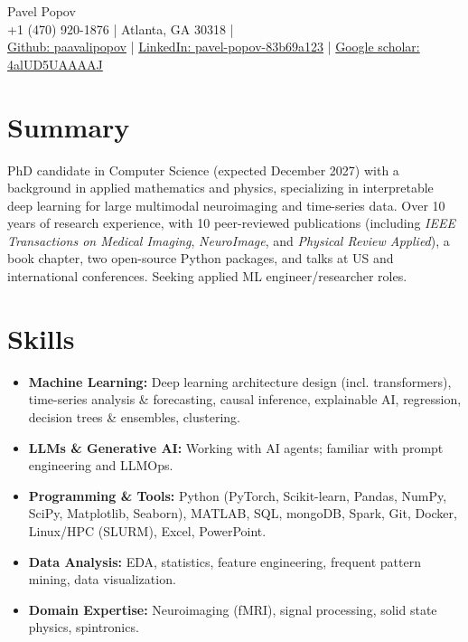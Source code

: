 \documentclass[11pt,a4paper]{article}
\begin{document}
\begin{center}
  {\Huge Pavel Popov}\\[0.5em]
  {\footnotesize +1 (470) 920-1876 \quad | \quad Atlanta, GA 30318} \quad | \\
  {\small \href{https://github.com/paavalipopov}{Github: paavalipopov} \quad | \quad
  \href{https://www.linkedin.com/in/pavel-popov-83b69a123/}{LinkedIn: pavel-popov-83b69a123} \quad | \quad
  \href{https://scholar.google.com/citations?user=4alUD5UAAAAJ}{Google scholar: 4alUD5UAAAAJ}}
\end{center}

\section*{Summary}
{\small \noindent PhD candidate in Computer Science (expected December 2027) with a background in applied mathematics and physics, specializing in interpretable deep learning for large multimodal neuroimaging and time-series data.
Over 10 years of research experience, with 10 peer-reviewed publications (including \textit{IEEE Transactions on Medical Imaging}, \textit{NeuroImage}, and \textit{Physical Review Applied}), a book chapter, two open-source Python packages, and talks at US and international conferences. Seeking applied ML engineer/researcher roles.}

\section*{Skills}
\begin{itemize}
[leftmargin=*,noitemsep]
\item \textbf{Machine Learning:} Deep learning architecture design (incl. transformers), time-series analysis \& forecasting, causal inference, explainable AI, regression, decision trees \& ensembles, clustering.
\item \textbf{LLMs \& Generative AI:} Working with AI agents; familiar with prompt engineering and LLMOps.
\item \textbf{Programming \& Tools:} Python (PyTorch, Scikit-learn, Pandas, NumPy, SciPy, Matplotlib, Seaborn), MATLAB, SQL, mongoDB, Spark, Git, Docker, Linux/HPC (SLURM), Excel, PowerPoint.
\item \textbf{Data Analysis:} EDA, statistics, feature engineering, frequent pattern mining, data visualization.
\item \textbf{Domain Expertise:} Neuroimaging (fMRI), signal processing, solid state physics, spintronics.
\end{itemize}
\end{document}
